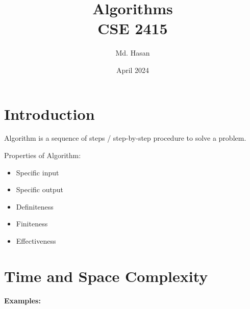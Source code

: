 \documentclass{article}
\title{Algorithms \\ CSE 2415}
\author{Md. Hasan}
\date{April 2024}
\begin{document}
\maketitle
\newpage

\section*{Introduction}

Algorithm is a sequence of steps / step-by-step procedure to solve a problem.

\vspace*{20pt}

Properties of Algorithm:

\begin{itemize}
    \item Specific input
    \item Specific output
    \item Definiteness
    \item Finiteness
    \item Effectiveness
\end{itemize}

\section*{Time and Space Complexity}

\textbf{Examples: }
\end{document}
